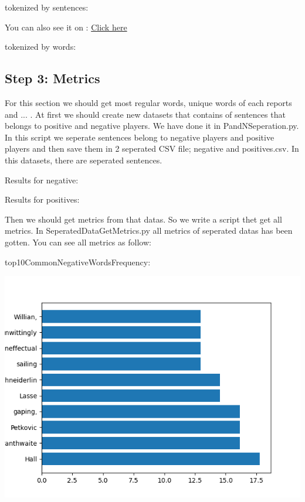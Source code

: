\documentclass{article}
\begin{document}
tokenized by sentences:
\begin{center}
\end{center}
You can also see it on : \href{https://huggingface.co/datasets/ParsaKgvr/socce_report_analysis}{Click here}


tokenized by words:
\begin{center}
\end{center}



\subsection{Step 3: Metrics}
For this section we should get most regular words, unique words of each reports and ... . At first we should create new datasets that contains of 
sentences that belongs to positive and negative players. We have done it in PandNSeperation.py. In this script we seperate sentences belong to negative players 
and positive players and then save them in 2 seperated CSV file; negative and positives.csv.
In this datasets, there are seperated sentences. 

Results for negative:
\begin{center}
\end{center}

Results for positives:
\begin{center}
\end{center}



Then we should get metrics from that datas. So we write a script thet get all metrics. In SeperatedDataGetMetrics.py all metrics of seperated datas
has been gotten. You can see all metrics as follow:
\begin{center}
\end{center}


top10CommonNegativeWordsFrequency:
\begin{center}
    \includegraphics{top10CommonNegativeWordsFrequency}
\end{center}
\end{document}
